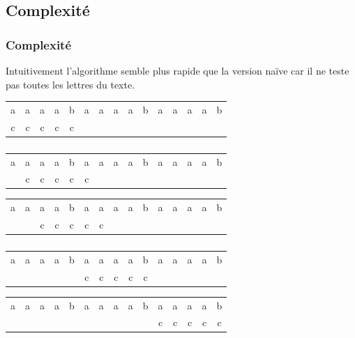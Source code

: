 \documentclass[svgnames,11pt]{beamer}
\begin{document}
\subsection{Complexité}
\begin{frame}
    \frametitle{Complexité}

    Intuitivement l'algorithme semble plus rapide que la version naïve car il ne teste pas toutes les lettres du texte.
\begin{center}
    \begin{tabular}{*{15}{c}}
        a&a&a&a&b&a&a&a&a&b&a&a&a&a&b\\
        c&c&c&c&c&&&&&&&&&&\\
    \end{tabular}
\end{center}

\end{frame}
\begin{frame}
    \frametitle{}

    \begin{center}
        \begin{tabular}{*{15}{c}}
            a&a&a&a&b&a&a&a&a&b&a&a&a&a&b\\
            &c&c&c&c&c&&&&&&&&&\\
        \end{tabular}
    \end{center}
    \begin{center}
        \begin{tabular}{*{15}{c}}
            a&a&a&a&b&a&a&a&a&b&a&a&a&a&b\\
            &&c&c&c&c&c&&&&&&&&\\
        \end{tabular}
    \end{center}

\end{frame}
\begin{frame}
    \frametitle{}

    \begin{center}
        \begin{tabular}{*{15}{c}}
            a&a&a&a&b&a&a&a&a&b&a&a&a&a&b\\
            &&&&&c&c&c&c&c&&&&&\\
        \end{tabular}
    \end{center}
    \begin{center}
        \begin{tabular}{*{15}{c}}
            a&a&a&a&b&a&a&a&a&b&a&a&a&a&b\\
            &&&&&&&&&&c&c&c&c&c\\
        \end{tabular}
    \end{center}

\end{frame}
\end{document}
